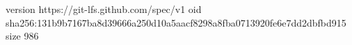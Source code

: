 version https://git-lfs.github.com/spec/v1
oid sha256:131b9b7167ba8d39666a250d10a5aacf8298a8fba0713920fe6e7dd2dbfbd915
size 986
